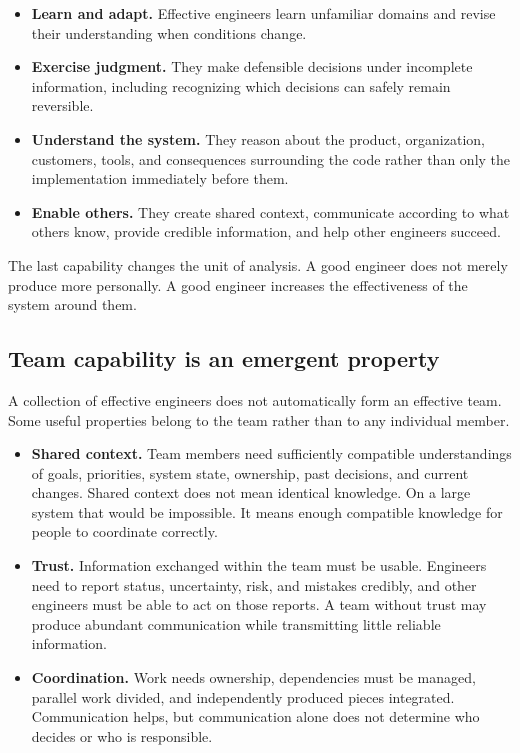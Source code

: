 \begin{itemize}
\tightlist
\item
  \textbf{Learn and adapt.} Effective engineers learn unfamiliar domains and revise their understanding
  when conditions change.
\item
  \textbf{Exercise judgment.} They make defensible decisions under incomplete information, including
  recognizing which decisions can safely remain reversible.
\item
  \textbf{Understand the system.} They reason about the product, organization, customers, tools, and
  consequences surrounding the code rather than only the implementation immediately before them.
\item
  \textbf{Enable others.} They create shared context, communicate according to what others know, provide
  credible information, and help other engineers succeed.
\end{itemize}

The last capability changes the unit of analysis. A good engineer does not merely produce more
personally. A good engineer increases the effectiveness of the system around them.

\subsection{Team capability is an emergent property}\label{sec-team-capability}

A collection of effective engineers does not automatically form an effective team. Some useful
properties belong to the team rather than to any individual member.

\begin{itemize}
\tightlist
\item
  \textbf{Shared context.} Team members need sufficiently compatible understandings of goals, priorities,
  system state, ownership, past decisions, and current changes. Shared context does not mean
  identical knowledge. On a large system that would be impossible. It means enough compatible
  knowledge for people to coordinate correctly.
\item
  \textbf{Trust.} Information exchanged within the team must be usable. Engineers need to report status,
  uncertainty, risk, and mistakes credibly, and other engineers must be able to act on those reports.
  A team without trust may produce abundant communication while transmitting little reliable
  information.
\item
  \textbf{Coordination.} Work needs ownership, dependencies must be managed, parallel work divided, and
  independently produced pieces integrated. Communication helps, but communication alone does not
  determine who decides or who is responsible.
\end{itemize}

